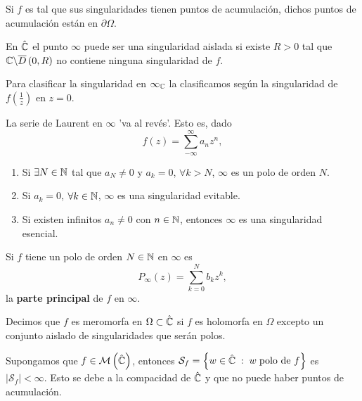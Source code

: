 Si $\displaystyle f $ es tal que sus singularidades tienen puntos de acumulación, dichos puntos de acumulación están en $\displaystyle \partial \Omega  $. 
\begin{definition}
En $\displaystyle \hat{\mathbb{C}} $ el punto $\displaystyle \infty  $ puede ser una singularidad aislada si existe $\displaystyle R > 0 $ tal que $\displaystyle \mathbb{C} \backslash \overline{D}\left(0,R\right) $ no contiene ninguna singularidad de $\displaystyle f $. 
\end{definition}
Para clasificar la singularidad en $\displaystyle \infty_{\mathbb{C}} $ la clasificamos según la singularidad de $\displaystyle f\left(\frac{1}{z}\right) $ en $\displaystyle z = 0 $.
\begin{observation}
La serie de Laurent en $\displaystyle \infty $ 'va al revés'. Esto es, dado
\[f\left(z\right)=\sum^{\infty}_{-\infty}a_{n}z^{n}, \]
\begin{enumerate}
\item Si $\displaystyle \exists N \in \mathbb{N} $ tal que $\displaystyle a_{N}\neq 0 $ y $\displaystyle a_{k}=0 $, $\displaystyle \forall k > N $, $\displaystyle \infty $ es un polo de orden $\displaystyle N $. 
\item Si $\displaystyle a_{k}= 0 $, $\displaystyle \forall k \in \mathbb{N} $, $\displaystyle \infty  $ es una singularidad evitable.
\item Si existen infinitos $\displaystyle a_{n}\neq 0 $ con $\displaystyle n \in \mathbb{N} $, entonces $\displaystyle \infty $ es una singularidad esencial. 
\end{enumerate}
\end{observation}
\begin{notation}
Si $\displaystyle f $ tiene un polo de orden $\displaystyle N \in \mathbb{N} $ en $\displaystyle \infty $ es
\[P_{\infty}\left(z\right)=\sum^{N}_{k=0}b_{k}z^{k} ,\]
la \textbf{parte principal} de $\displaystyle f $ en $\displaystyle \infty  $. 
\end{notation}
\begin{definition}
Decimos que $\displaystyle f $ es meromorfa en $\displaystyle \Omega\subset \hat{\mathbb{C}} $ si $\displaystyle f $ es holomorfa en $\displaystyle \Omega  $ excepto un conjunto aislado de singularidades que serán polos.
\end{definition}
\begin{observation}
	Supongamos que $\displaystyle f \in \mathcal{M}\left(\hat{\mathbb{C}}\right)$, entonces $\displaystyle \mathcal{S}_{f}= \left\{ w \in \hat{\mathbb{C}} \; : \; w \; \text{polo de }f\right\}  $ es $\displaystyle \left|\mathcal{S}_{f}\right|<\infty  $. Esto se debe a la compacidad de $\displaystyle \hat{\mathbb{C}} $ y que no puede haber puntos de acumulación.
\end{observation}
